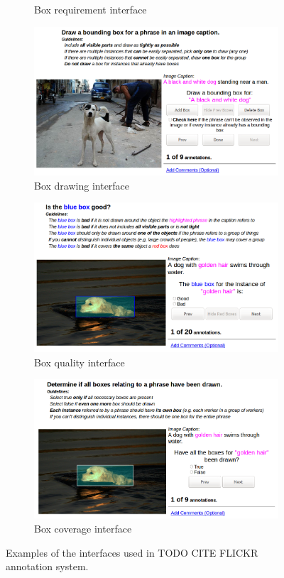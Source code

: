 \begin{figure}
\begin{subfigure}{.45\textwidth}
    \caption{Box requirement interface}
    \label{fig:flickr30k-example-box-requirement}
  \end{subfigure}
  \begin{subfigure}{.45\textwidth}
    \centering
    \includegraphics[width=.8\linewidth]{figures/flickr30k-example-box-drawing.png}
    \caption{Box drawing interface}
    \label{fig:flickr30k-example-box-drawing}
  \end{subfigure}
  \begin{subfigure}{.45\textwidth}
    \centering
    \includegraphics[width=.8\linewidth]{figures/flickr30k-example-box-quality.png}
    \caption{Box quality interface}
    \label{fig:flickr30k-example-box-quality}
  \end{subfigure}
  \begin{subfigure}{.45\textwidth}
    \centering
    \includegraphics[width=.8\linewidth]{figures/flickr30k-example-box-coverage.png}
    \caption{Box coverage interface}
    \label{fig:flickr30k-example-box-coverage}
  \end{subfigure}
  \caption{Examples of the interfaces used in TODO CITE FLICKR annotation system.}
  \label{fig:flickr30k-example}
\end{figure}

